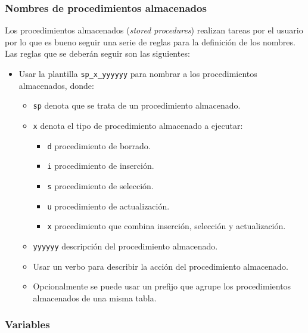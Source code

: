 \subsubsection{Nombres de procedimientos almacenados}

Los procedimientos almacenados (\emph{stored procedures}) realizan tareas por el
usuario por lo que es bueno seguir una serie de reglas para la definición de los
nombres. Las reglas que se deberán seguir son las siguientes:

\begin{itemize}

\item Usar la plantilla \texttt{sp\_x\_yyyyyy} para nombrar a los procedimientos
  almacenados, donde:

  \begin{itemize}

  \item \texttt{sp} denota que se trata de un procedimiento almacenado.

  \item \texttt{x} denota el tipo de procedimiento almacenado a ejecutar:

    \begin{itemize}
    \item \texttt{d} procedimiento de borrado.
    \item \texttt{i} procedimiento de inserción.
    \item \texttt{s} procedimiento de selección.
    \item \texttt{u} procedimiento de actualización.
    \item \texttt{x} procedimiento que combina inserción, selección y
      actualización.
    \end{itemize}

  \item \texttt{yyyyyy} descripción del procedimiento almacenado.

  \item Usar un verbo para describir la acción del procedimiento almacenado.

  \item Opcionalmente se puede usar un prefijo que agrupe los procedimientos
    almacenados de una misma tabla.

  \end{itemize}

\end{itemize}

\subsubsection{Variables}

